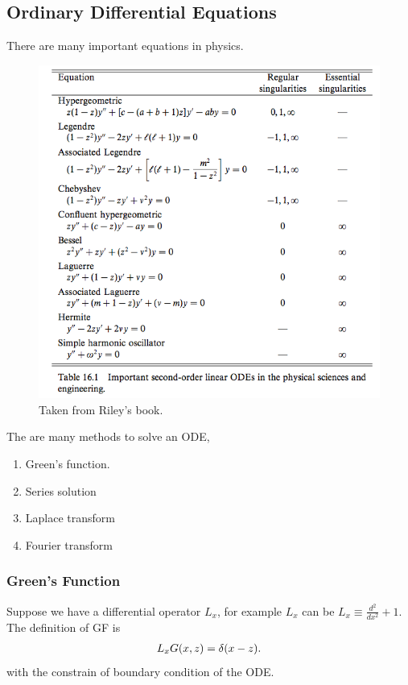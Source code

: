 \documentclass[letterpaper,10pt,english]{sphinxmanual}
\begin{document}
\subsection{Ordinary Differential Equations}
\label{equation-solving:ordinary-differential-equations}
There are many important equations in physics.
\begin{figure}[htbp]
\centering
\capstart

\includegraphics{2ndODEs.png}
\caption{Taken from Riley's book.}\end{figure}

The are many methods to solve an ODE,
\begin{enumerate}
\item {} 
Green's function.

\item {} 
Series solution

\item {} 
Laplace transform

\item {} 
Fourier transform

\end{enumerate}


\subsubsection{Green's Function}
\label{equation-solving:green-s-function}
Suppose we have a differential operator \(L_x\), for example \(L_x\) can be \(L_x\equiv \frac{d^2}{dx^2}+1\). The definition of GF is
\begin{gather}
\begin{split}L_x G(x,z) = \delta(x-z).\end{split}\notag
\end{gather}
with the constrain of boundary condition of the ODE.
\end{document}
